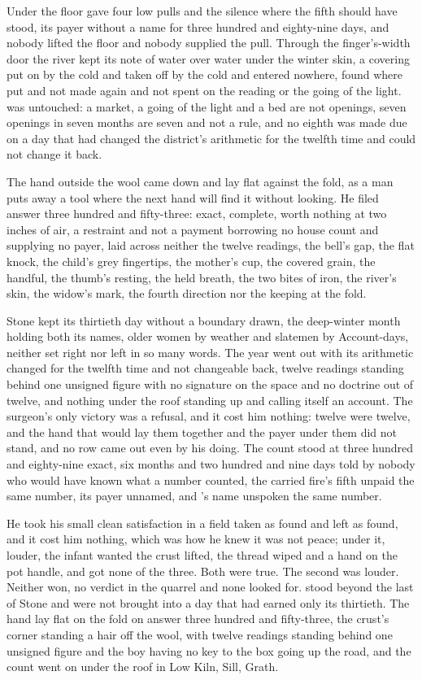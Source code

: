 Under the floor  gave four low pulls and the silence where the fifth should have stood, its payer without a name for three hundred and eighty-nine days, and nobody lifted the floor and nobody supplied the pull. Through the finger's-width door the river kept its note of water over water under the winter skin, a covering put on by the cold and taken off by the cold and entered nowhere, found where put and not made again and not spent on the reading or the going of the light.  was untouched: a market, a going of the light and a bed are not openings, seven openings in seven months are seven and not a rule, and no eighth was made due on a day that had changed the district's arithmetic for the twelfth time and could not change it back.

The hand outside the wool came down and lay flat against the fold, as a man puts away a tool where the next hand will find it without looking. He filed answer three hundred and fifty-three: exact, complete, worth nothing at two inches of air, a restraint and not a payment borrowing no house count and supplying no payer, laid across neither the twelve readings, the bell's gap, the flat knock, the child's grey fingertips, the mother's cup, the covered grain, the handful, the thumb's resting, the held breath, the two bites of iron, the river's skin, the widow's mark, the fourth direction nor the keeping at the fold.

Stone kept its thirtieth day without a boundary drawn, the deep-winter month holding both its names, older women by weather and slatemen by  Account-days, neither set right nor left in so many words. The year went out with its arithmetic changed for the twelfth time and not changeable back, twelve readings standing behind one unsigned figure with no signature on the space and no doctrine out of twelve, and nothing under the roof standing up and calling itself an account. The surgeon's only victory was a refusal, and it cost him nothing: twelve were twelve, and the hand that would lay them together and the payer under them did not stand, and no row came out even by his doing. The count stood at three hundred and eighty-nine exact, six months and two hundred and nine days told by nobody who would have known what a number counted, the carried fire's fifth unpaid the same number, its payer unnamed, and 's name unspoken the same number.

He took his small clean satisfaction in a field taken as found and left as found, and it cost him nothing, which was how he knew it was not peace; under it, louder, the infant wanted the crust lifted, the thread wiped and a hand on the pot handle, and got none of the three. Both were true. The second was louder. Neither won, no verdict in the quarrel and none looked for.  stood beyond the last of Stone and were not brought into a day that had earned only its thirtieth. The hand lay flat on the fold on answer three hundred and fifty-three, the crust's corner standing a hair off the wool, with twelve readings standing behind one unsigned figure and the boy having no key to the box going up the road, and the count went on under the roof in Low Kiln, Sill, Grath.
